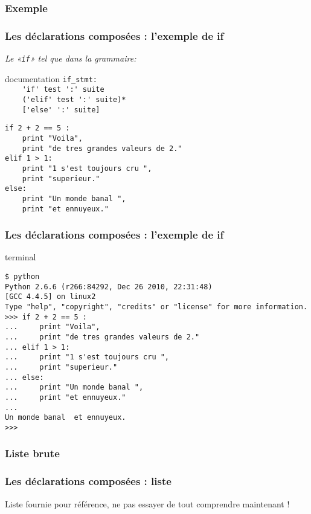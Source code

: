 \subsubsection{Exemple}
\begin{frame}[fragile]
  \frametitle{Les déclarations composées : l'exemple de if}
  \emph{Le «\texttt{if}» tel que dans la grammaire:}\\
  \begin{beamercolorbox}{documentation}
  \small{\verb|if_stmt:|} \\
  \small{\verb|    'if' test ':' suite|} \\
  \small{\verb|    ('elif' test ':' suite)*|} \\
  \small{\verb|    ['else' ':' suite]|}
  \end{beamercolorbox}
  \pause
  \begin{lstlisting}
if 2 + 2 == 5 :
    print "Voila",
    print "de tres grandes valeurs de 2."
elif 1 > 1:
    print "1 s'est toujours cru ",
    print "superieur."
else:
    print "Un monde banal ",
    print "et ennuyeux."
  \end{lstlisting}

\end{frame}

\begin{frame}[fragile]
  \frametitle{Les déclarations composées : l'exemple de if}
  \begin{beamercolorbox}{terminal}
\scriptsize\begin{verbatim}$ python
Python 2.6.6 (r266:84292, Dec 26 2010, 22:31:48)
[GCC 4.4.5] on linux2
Type "help", "copyright", "credits" or "license" for more information.
>>> if 2 + 2 == 5 :
...     print "Voila",
...     print "de tres grandes valeurs de 2."
... elif 1 > 1:
...     print "1 s'est toujours cru ",
...     print "superieur."
... else:
...     print "Un monde banal ",
...     print "et ennuyeux."
...
Un monde banal  et ennuyeux.
>>>
\end{verbatim}
  \end{beamercolorbox}
\end{frame}

\subsubsection{Liste brute}
\begin{frame}[fragile]
  \frametitle{Les déclarations composées : liste}
Liste fournie pour référence, ne pas essayer de tout comprendre maintenant !
\end{frame}

